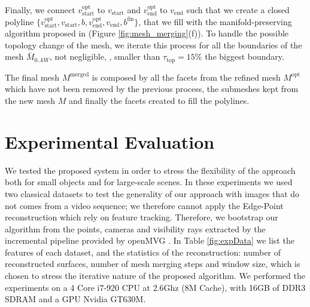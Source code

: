 Finally, we connect $v_{\text{start}}^{\text{opt}}$ to $v_{\text{start}}$  and $v_{\text{end}}^{\text{opt}}$ to  $v_{\text{end}}$ such that we create a closed polyline $\{v_{\text{start}}^{\text{opt}},  v_{\text{start}}, \mathit{b}, v_{\text{end}}^{\text{opt}}, v_{\text{end}}, \mathit{b}^{\text{fin}}\}$, that we fill with the manifold-preserving algorithm proposed in \cite{liepa2003filling}  (Figure \ref{fig:mesh_merging}(f)). 
To handle the possible topology change of the mesh, we iterate this process for all the boundaries of the mesh  $\mathit{\bar{M}}_{0..kW}$, not negligible, \ie, smaller than $\tau_{\text{top}}= 15\%$ the biggest boundary.

The final mesh $\mathit{M}^{\text{merged}}$ is composed by all the facets from the refined mesh $\mathit{M}^{\text{opt}}$ which have not been removed by the previous process, the submeshes kept from the new mesh $\mathit{M}$ and finally the facets created to fill the polylines.



\section{Experimental Evaluation}
\label{sec:exp}
We tested the proposed system in order to stress the flexibility of the approach both for small objects and for large-scale scenes.
In these experiments we used two classical \mvs datasets to test the generality of our approach with  images that do not comes from a video  sequence; we therefore cannot apply the Edge-Point reconstruction which rely on feature tracking. 
Therefore, we bootstrap our algorithm from the points, cameras and visibility rays extracted by the incremental pipeline provided by openMVG \cite{openMVG}. 
In Table \ref{fig:expData} we list the features of each dataset, and the statistics of the reconstruction: number of reconstructed surfaces, number of mesh merging steps and window size, which is chosen to stress the iterative nature of the proposed algorithm.
We performed the experiments on a 4 Core i7-920 CPU at 2.6Ghz (8M Cache), with 16GB of DDR3 SDRAM and a GPU Nvidia GT630M.


